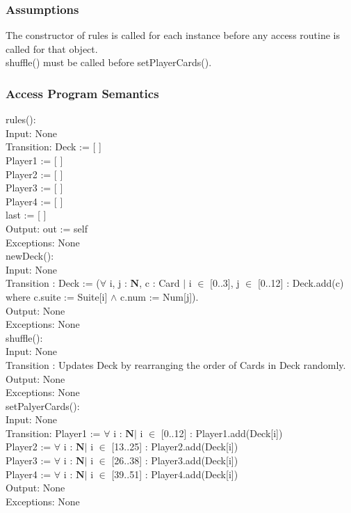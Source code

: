 \documentclass[12pt, titlepage]{article}
\begin{document}
\subsubsection{Assumptions}
The constructor of rules is called for each instance before any access routine is called for that object.\\

\noindent shuffle() must be called before setPlayerCards().
\subsubsection{Access Program Semantics}
rules():\\
Input: None\\
Transition: Deck := [ ]\\
Player1 := [ ]\\
Player2 := [ ]\\
Player3 := [ ]\\
Player4 := [ ]\\
last := [ ]\\
Output: out := self\\
Exceptions: None\\

\noindent newDeck():\\
Input: None\\
Transition : Deck := ($\forall$ i, j : $\mathbf{N}$, c : Card $|$ i $\in$ [0..3], j $\in$ [0..12] : Deck.add(c) where c.suite := Suite[i] $\land$ c.num := Num[j]).\\
Output: None \\
Exceptions: None \\

\noindent shuffle():\\
Input: None\\
Transition : Updates Deck by rearranging the order of Cards in Deck randomly.\\
Output: None\\
Exceptions: None\\

\noindent setPalyerCards():\\
Input: None\\
Transition: Player1 := $\forall$ i : $\mathbf{N} |$ i $\in$  [0..12] : Player1.add(Deck[i])\\
Player2 := $\forall$ i : $\mathbf{N} |$ i $\in$  [13..25] : Player2.add(Deck[i])\\
Player3 := $\forall$ i : $\mathbf{N} |$ i $\in$  [26..38] : Player3.add(Deck[i])\\
Player4 := $\forall$ i : $\mathbf{N} |$ i $\in$  [39..51] : Player4.add(Deck[i])\\
Output: None\\
Exceptions: None\\
\end{document}
